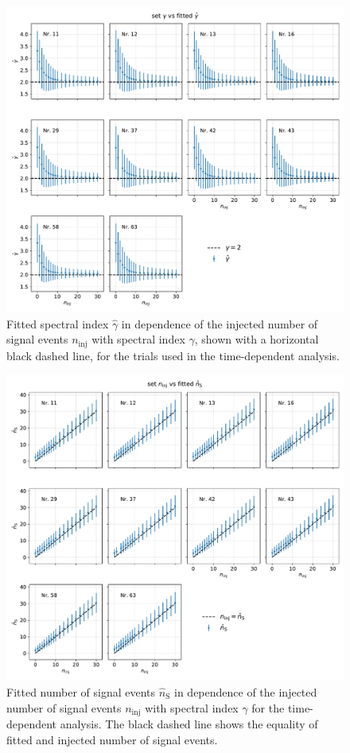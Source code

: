 \begin{figure}
    \centering
    \includegraphics[width=\linewidth]{Plots/05_csky/gamma_fit_time_dep.pdf}
    \caption{Fitted spectral index $\hat\gamma$ in dependence of the injected number of signal events $n_\text{inj}$ with spectral index $\gamma$, shown with a horizontal black dashed line, for the trials used in the time-dependent analysis.}
    \label{fig:gamma_fit_time_dep}
\end{figure}

\begin{figure}
    \centering
    \includegraphics[width=\linewidth]{Plots/05_csky/ns_fit_time_dep.pdf}
    \caption{Fitted number of signal events $\hat{n}_{\text{S}}$ in dependence of the injected number of signal events $n_\text{inj}$ with spectral index $\gamma$ for the time-dependent analysis. The black dashed line shows the equality of fitted and injected number of signal events.}
    \label{fig:ns_fit_time_dep}
\end{figure}
